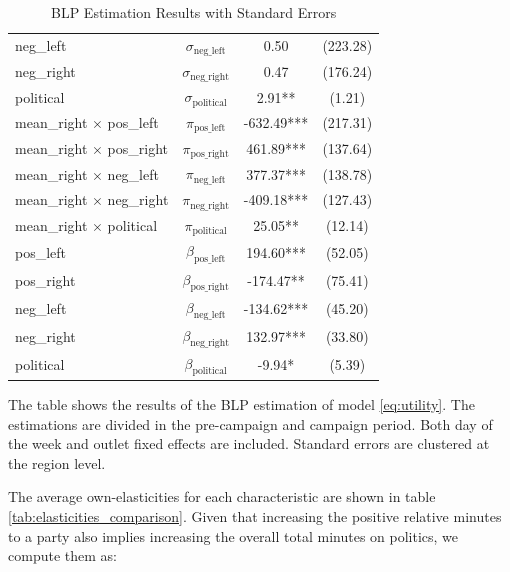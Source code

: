 \documentclass[12pt]{article}
\begin{document}
\begin{table}[ht]
\begin{threeparttable}
\begin{tabular}{lccc}
				neg\_left & $ \sigma_{\text{neg\_left}} $ & 0.50 & (223.28) \\
				neg\_right & $ \sigma_{\text{neg\_right}} $ & 0.47 & (176.24) \\
				political & $ \sigma_{\text{political}} $ & 2.91** & (1.21) \\
				\hline
				mean\_right $\times $ pos\_left & $ \pi_{\text{pos\_left}} $ & -632.49*** & (217.31) \\
				mean\_right $\times $ pos\_right & $ \pi_{\text{pos\_right}} $ & 461.89*** & (137.64) \\
				mean\_right $\times $ neg\_left & $ \pi_{\text{neg\_left}} $ & 377.37*** & (138.78) \\
				mean\_right $\times $ neg\_right & $ \pi_{\text{neg\_right}} $ & -409.18*** & (127.43) \\
				mean\_right $\times $ political & $ \pi_{\text{political}} $ & 25.05** & (12.14) \\
				\hline
				pos\_left & $ \beta_{\text{pos\_left}} $ & 194.60*** & (52.05) \\
				pos\_right & $ \beta_{\text{pos\_right}} $ & -174.47** & (75.41) \\
				neg\_left & $ \beta_{\text{neg\_left}} $ & -134.62*** & (45.20) \\
				neg\_right & $ \beta_{\text{neg\_right}} $ & 132.97*** & (33.80) \\
				political & $ \beta_{\text{political}} $ & -9.94* & (5.39) \\
				\hline
				\hline
			\end{tabular}
			\caption{BLP Estimation Results with Standard Errors 				\label{table:results_blp}}
			\begin{tablenotes}
				\small
				\item The table shows the results of the BLP estimation of model \ref{eq:utility}. The estimations are divided in the pre-campaign and campaign period. Both day of the week and outlet fixed effects are included. Standard errors are clustered at the region level. 
			\end{tablenotes}
			
		\end{threeparttable}
		
	\end{table}
	
	
	The average own-elasticities for each characteristic are shown in table \ref{tab:elasticities_comparison}. Given that increasing the positive relative minutes to a party also implies increasing the overall total minutes on politics, we compute them as:
	
\end{document}
